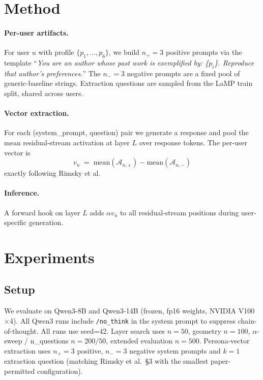 \documentclass[10pt]{article}
\begin{document}
\section{Method}
\paragraph{Per-user artifacts.}
For user $u$ with profile $\{p_1,\dots,p_6\}$, we build $n_+\!=\!3$ positive
prompts via the template
``\emph{You are an author whose past work is exemplified by: \{$p_i$\}.
Reproduce that author's preferences.}''
The $n_-\!=\!3$ negative prompts are a fixed pool of generic-baseline
strings.  Extraction questions are sampled from the LaMP train split,
shared across users.

\paragraph{Vector extraction.}
For each (system\_prompt, question) pair we generate a response and pool the
mean residual-stream activation at layer $L$ over response tokens.  The
per-user vector is
\[
v_u \;=\; \mathrm{mean}(\mathcal{A}_{u,+}) - \mathrm{mean}(\mathcal{A}_{u,-})
\]
exactly following Rimsky et al.

\paragraph{Inference.}
A forward hook on layer $L$ adds $\alpha v_u$ to all residual-stream
positions during user-specific generation.



\section{Experiments}

\subsection{Setup}
We evaluate on Qwen3-8B and Qwen3-14B (frozen, fp16 weights, NVIDIA V100
$\times$4).  All Qwen3 runs include \texttt{/no\_think} in the system prompt
to suppress chain-of-thought.  All runs use seed=42.  Layer search uses
$n{=}50$, geometry $n{=}100$, $\alpha$-sweep / n\_questions $n{=}200/50$,
extended evaluation $n{=}500$.  Persona-vector extraction uses
$n_+{=}3$ positive, $n_-{=}3$ negative system prompts and $k{=}1$ extraction
question (matching Rimsky et al.\ §3 with the smallest paper-permitted
configuration).
\end{document}
